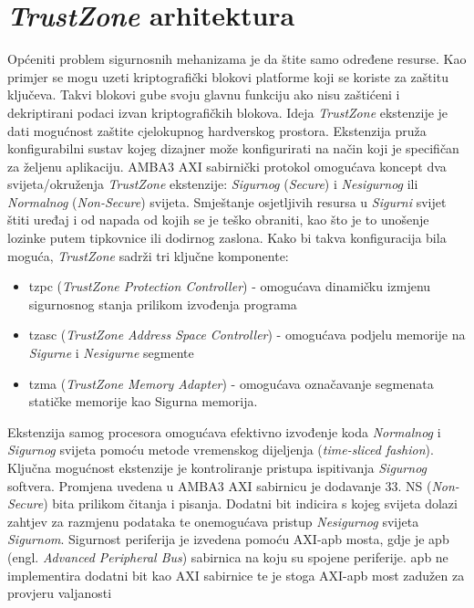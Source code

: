 \documentclass[times, utf8, diplomski, numeric]{fer}
\begin{document}
\section{\textit{TrustZone} arhitektura}
Općeniti problem sigurnosnih mehanizama je da štite samo određene resurse. Kao primjer se mogu uzeti kriptografički blokovi
platforme koji se koriste za zaštitu ključeva. Takvi blokovi gube svoju glavnu funkciju ako nisu zaštićeni i dekriptirani
podaci izvan kriptografičkih blokova. Ideja \textit{TrustZone} ekstenzije je dati mogućnost zaštite cjelokupnog hardverskog
prostora. Ekstenzija pruža konfigurabilni sustav kojeg dizajner može konfigurirati na način koji je specifičan za željenu
aplikaciju. AMBA3 AXI sabirnički protokol omogućava koncept dva svijeta/okruženja \textit{TrustZone} ekstenzije: \textit{Sigurnog} (\textit{Secure}) i
\textit{Nesigurnog} ili \textit{Normalnog} (\textit{Non-Secure}) svijeta. Smještanje osjetljivih resursa u \textit{Sigurni} svijet štiti uređaj i od napada
od kojih se je teško obraniti, kao što je to unošenje lozinke putem tipkovnice ili dodirnog zaslona.
Kako bi takva konfiguracija bila moguća, \textit{TrustZone} sadrži tri ključne komponente:
\begin{itemize}
  \item{\gls{tzpc} (\textit{TrustZone Protection Controller}) - omogućava dinamičku izmjenu sigurnosnog stanja prilikom izvođenja
  programa}
  \item{\gls{tzasc} (\textit{TrustZone Address Space Controller}) - omogućava podjelu memorije na \textit{Sigurne} i \textit{Nesigurne} segmente}
  \item{\gls{tzma} (\textit{TrustZone Memory Adapter}) - omogućava označavanje segmenata statičke memorije kao Sigurna memorija.}
\end{itemize}
Ekstenzija samog procesora
omogućava efektivno izvođenje koda \textit{Normalnog} i \textit{Sigurnog} svijeta pomoću metode vremenskog dijeljenja (\textit{time-sliced
fashion}). Ključna mogućnost ekstenzije je kontroliranje pristupa ispitivanja \textit{Sigurnog} softvera. Promjena uvedena u AMBA3
AXI sabirnicu je dodavanje 33. NS (\textit{Non-Secure}) bita prilikom čitanja i pisanja. Dodatni bit indicira s kojeg
svijeta dolazi zahtjev za razmjenu podataka te onemogućava pristup \textit{Nesigurnog} svijeta \textit{Sigurnom}. Sigurnost periferija je
izvedena pomoću AXI-\gls{apb} mosta, gdje je \gls{apb} (engl. \textit{Advanced Peripheral Bus}) sabirnica na koju su spojene
periferije. \gls{apb} ne implementira dodatni bit kao AXI sabirnice te je stoga AXI-\gls{apb} most zadužen za provjeru valjanosti
\end{document}
